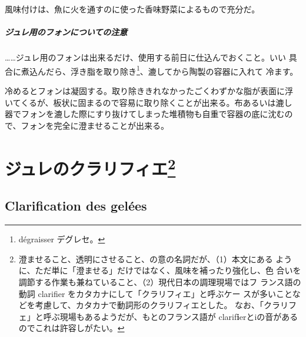 \begin{recette}
風味付けは、魚に火を通すのに使った香味野菜によるもので充分だ。

\hypertarget{observation-sur-l-emplois-des-fonds-destines-aux-gelees}{%
\subparagraph{ジュレ用のフォンについての注意}\label{observation-sur-l-emplois-des-fonds-destines-aux-gelees}}

\ldots{}\ldots{}ジュレ用のフォンは出来るだけ、使用する前日に仕込んでおくこと。いい
具合に煮込んだら、浮き脂を取り除き\footnote{dégraisser デグレセ。}、漉してから陶製の容器に入れて
冷ます。

冷めるとフォンは凝固する。取り除ききれなかったごくわずかな脂が表面に浮
いてくるが、板状に固まるので容易に取り除くことが出来る。布あるいは漉し
器でフォンを漉した際にすり抜けてしまった堆積物も自重で容器の底に沈むの
で、フォンを完全に澄ませることが出来る。
\end{recette}
\hypertarget{ux30b8ux30e5ux30ecux306eux30afux30e9ux30eaux30d5ux30a3ux30a816}{%
\section[ジュレのクラリフィエ]{\texorpdfstring{ジュレのクラリフィエ\footnote{澄ませること、透明にさせること、の意の名詞だが、（1）本文にある
  ように、ただ単に「澄ませる」だけではなく、風味を補ったり強化し、色
  合いを調節する作業も兼ねていること、（2）現代日本の調理現場ではフ
  ランス語の動詞 clarifier をカタカナにして「クラリフィエ」と呼ぶケー
  スが多いことなどを考慮して、カタカナで動詞形のクラリフィエとした。
  なお、「クラリフェ」と呼ぶ現場もあるようだが、もとのフランス語が
  clarif\textbf{i}erとiの音があるのでこれは許容しがたい。}}{ジュレのクラリフィエ}}\label{ux30b8ux30e5ux30ecux306eux30afux30e9ux30eaux30d5ux30a3ux30a816}}

\hypertarget{clariication-des-gelees}{%
\subsection{Clarification des gelées}\label{clariication-des-gelees}}

